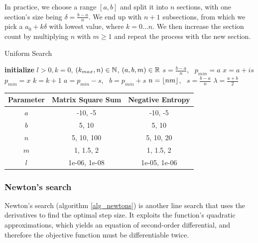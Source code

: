 \documentclass[english, 12pt, a4paper, sci, utf8, a-1b, online, table]{aaltothesis}
\newcommand{\floor}[1]{\ensuremath\lfloor#1\rfloor}
\newcommand{\R}{\ensuremath\mathbb{R}}
\newcommand{\N}{\ensuremath\mathbb{N}}
\begin{document}
In practice, we choose a range $[a, b]$ and split it into $n$ sections, with one section's size being $\delta = \frac{b - a}{n}$. We end up with $n + 1$ subsections, from which we pick a $a_0 + k \delta$ with lowest value, where $k = 0 \dots n$. We then increase the section count by multiplying $n$ with $m \geq 1$ and repeat the process with the new section.

\begin{algorithm}[H]
\caption{Uniform Search}
\label{alg_uniform}
\begin{algorithmic}[1]
\STATE \textbf{initialize} $l > 0, k = 0$, $(k_{max}, n) \in \N$, $(a, b, m) \in \R$
\STATE $s = \frac{b - a}{n}$, \ $p_{min} = a$
        \STATE $x = a + i s$
            \STATE $p_{min} = x$
        \ENDIF
        \STATE $k = k + 1$
    \ENDFOR
    \STATE $a = p_{min} - s$, \ $b = p_{min} + s$
    \STATE $n = \floor{n m}$, \ $s = \frac{b - a}{n}$
\ENDWHILE
\RETURN $\lambda = \frac{a + b}{2}$
\end{algorithmic}
\end{algorithm}

\begin{table}[H]
\label{tab:params_UniformSearch}
\centering
{}
\begin{tabular}{|c|c|c|}
\hline
\rowcolor{gray!25}
Parameter & Matrix Square Sum & Negative Entropy \\
\hline
$a$ & -10, -5 & -10, -5 \\
$b$ & 5, 10 & 5, 10 \\
$n$ & 5, 10, 100 & 5, 10, 20 \\
$m$ & 1, 1.5, 2 & 1, 1.5, 2 \\
$l$ & 1e-06, 1e-08 & 1e-05, 1e-06 \\
\hline
\end{tabular}
\end{table}


\subsubsection{Newton's search}
\label{sect:newtonssearch}


Newton's search (algorithm \ref{alg_newtons}) is another line search that uses the derivatives to find the optimal step size. It exploits the function's quadratic approximations, which yields an equation of second-order differential, and therefore the objective function must be differentiable twice. \cite{book:nonlinear_programming}
\end{document}
